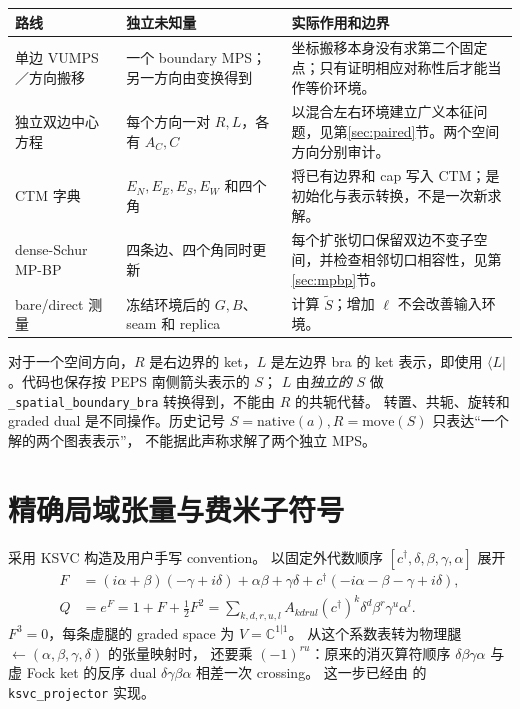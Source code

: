 \documentclass[11pt]{article}
\newcommand{\tS}{\widetilde S}
\newcommand{\code}[1]{{\small\texttt{#1}}}
\begin{document}
\begin{center}\small
\begin{tabular}{P{30mm}P{55mm}P{63mm}}
\toprule
路线 & 独立未知量 & 实际作用和边界 \\
\midrule
单边 VUMPS／方向搬移 & 一个 boundary MPS；另一方向由变换得到 & 坐标搬移本身没有求第二个固定点；只有证明相应对称性后才能当作等价环境。\\
独立双边中心方程 & 每个方向一对 $R,L$，各有 $A_C,C$ & 以混合左右环境建立广义本征问题，见第\ref{sec:paired}节。两个空间方向分别审计。\\
CTM 字典 & $E_N,E_E,E_S,E_W$ 和四个角 & 将已有边界和 cap 写入 CTM；是初始化与表示转换，不是一次新求解。\\
dense-Schur MP-BP & 四条边、四个角同时更新 & 每个扩张切口保留双边不变子空间，并检查相邻切口相容性，见第\ref{sec:mpbp}节。\\
bare/direct 测量 & 冻结环境后的 $G,B$、seam 和 replica & 计算 $\tS$；增加 $\ell$ 不会改善输入环境。\\
\bottomrule
\end{tabular}
\end{center}

对于一个空间方向，$R$ 是右边界的 ket，$L$ 是左边界 bra 的 ket 表示，即使用
$\langle L|$。代码也保存按 PEPS 南侧箭头表示的 $S$；
$L$ 由\emph{独立的} $S$ 做 \code{\_spatial\_boundary\_bra} 转换得到，不能由 $R$ 的共轭代替。
转置、共轭、旋转和 graded dual 是不同操作。历史记号
$S=\mathrm{native}(a),R=\mathrm{move}(S)$ 只表达“一个解的两个图表表示”，
不能据此声称求解了两个独立 MPS。

\section{精确局域张量与费米子符号}
\label{sec:signs}
采用 KSVC 构造及用户手写 convention\cite{ksvc,hand}。
以固定外代数顺序 $[c^\dagger,\delta,\beta,\gamma,\alpha]$ 展开
\begin{align}
 F&=(i\alpha+\beta)(-\gamma+i\delta)+\alpha\beta+\gamma\delta
       +c^\dagger(-i\alpha-\beta-\gamma+i\delta),\\
 Q&=e^F=1+F+\tfrac12 F^2
   =\sum_{k,d,r,u,l} A_{k d r u l}
       (c^\dagger)^k\delta^d\beta^r\gamma^u\alpha^l .
\end{align}
$F^3=0$，每条虚腿的 graded space 为 $V=\mathbb C^{1|1}$。
从这个系数表转为物理腿 $\leftarrow(\alpha,\beta,\gamma,\delta)$ 的张量映射时，
还要乘 $(-1)^{ru}$：原来的消灭算符顺序 $\delta\beta\gamma\alpha$
与虚 Fock ket 的反序 dual $\delta\gamma\beta\alpha$ 相差一次 crossing。
这一步已经由  的 \code{ksvc\_projector} 实现。
\end{document}
